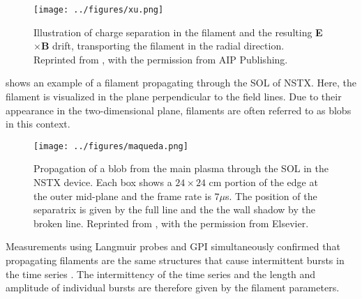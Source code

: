 \begin{figure}[t]
  \centering
  \texttt{[image: ../figures/xu.png]}
  \caption{Illustration of charge separation in the filament and the resulting \textbf{E}$\times$\textbf{B} drift, transporting the filament in the radial direction. Reprinted from \cite{xu2010intermittent}, with the permission from AIP Publishing.}
  \label{Fig:xu}
\end{figure}
 shows an example of a filament propagating through the SOL of NSTX. Here, the filament is visualized in the plane perpendicular to the field lines. Due to their appearance in the two-dimensional plane, filaments are often referred to as blobs in this context.
\begin{figure}[t]
  \centering
  \texttt{[image: ../figures/maqueda.png]}
  \caption{Propagation of a blob from the main plasma through the SOL in the NSTX device. Each box shows a $24\times24$ cm portion of the edge at the outer mid-plane and the frame rate is $7 \mu $s. The position of the separatrix is given by the full line and the the wall shadow by the broken line. Reprinted from \cite{maqueda2011intermittency}, with the permission from Elsevier.}
  \label{Fig:maqueda}
\end{figure}

Measurements using Langmuir probes and GPI simultaneously confirmed that propagating
filaments are the same structures that cause intermittent bursts in the time series
\cite{grulke2014experimental,zweben2015edge}. The intermittency of the time series and
the length and amplitude of individual bursts are therefore given by the filament
parameters.

